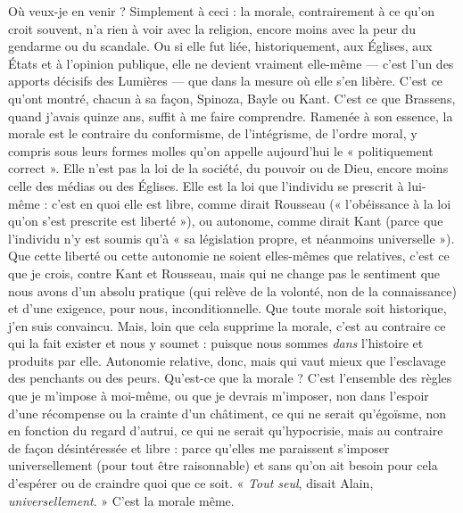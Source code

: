 Où veux-je en venir ? Simplement à ceci : la morale, contrairement à ce
qu'on croit souvent, n’a rien à voir avec la religion, encore moins avec la peur
du gendarme ou du scandale. Ou si elle fut liée, historiquement, aux Églises,
aux États et à l’opinion publique, elle ne devient vraiment elle-même — c’est
l’un des apports décisifs des Lumières — que dans la mesure où elle s’en libère.
C’est ce qu'ont montré, chacun à sa façon, Spinoza, Bayle ou Kant. C’est ce
que Brassens, quand j'avais quinze ans, suffit à me faire comprendre. Ramenée
à son essence, la morale est le contraire du conformisme, de l’intégrisme, de
l’ordre moral, y compris sous leurs formes molles qu’on appelle aujourd’hui le
« politiquement correct ». Elle n’est pas la loi de la société, du pouvoir ou de
Dieu, encore moins celle des médias ou des Églises. Elle est la loi que l'individu
se prescrit à lui-même : c’est en quoi elle est libre, comme dirait Rousseau
(« l’obéissance à la loi qu’on s’est prescrite est liberté »), ou autonome, comme
dirait Kant (parce que l'individu n’y est soumis qu’à « sa législation propre, et
néanmoins universelle »). Que cette liberté ou cette autonomie ne soient elles-mêmes
que relatives, c’est ce que je crois, contre Kant et Rousseau, mais qui ne
change pas le sentiment que nous avons d’un absolu pratique (qui relève de la
volonté, non de la connaissance) et d’une exigence, pour nous, inconditionnelle.
Que toute morale soit historique, j’en suis convaincu. Mais, loin que cela
supprime la morale, c’est au contraire ce qui la fait exister et nous y soumet :
puisque nous sommes {\it dans} l’histoire et produits par elle. Autonomie relative,
donc, mais qui vaut mieux que l’esclavage des penchants ou des peurs. Qu’est-ce
que la morale ? C’est l’ensemble des règles que je m'impose à moi-même, ou
que je devrais m’imposer, non dans l’espoir d’une récompense ou la crainte
d’un châtiment, ce qui ne serait qu’égoïsme, non en fonction du regard
d’autrui, ce qui ne serait qu'hypocrisie, mais au contraire de façon désintéressée
et libre : parce qu’elles me paraissent s’imposer universellement (pour tout être
raisonnable) et sans qu’on ait besoin pour cela d’espérer ou de craindre quoi
que ce soit. « {\it Tout seul}, disait Alain, {\it universellement}. » C’est la morale même.

